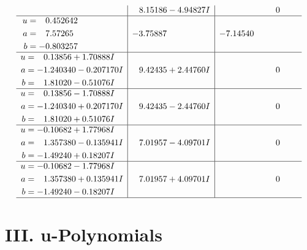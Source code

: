 \documentclass[1p]{elsarticle_modified}
\theoremstyle{definition}
\begin{document}
$$\begin{array}{c|c|c}
 & \phantom{-}8.15186 - 4.94827 I & \phantom{-0.000000 } 0 \\ \hline\begin{aligned}
u &= \phantom{-}0.452642\phantom{ +0.000000I} \\
a &= \phantom{-}7.57265\phantom{ +0.000000I} \\
b &= -0.803257\phantom{ +0.000000I}\end{aligned}
 & -3.75887\phantom{ +0.000000I} & -7.14540\phantom{ +0.000000I} \\ \hline\begin{aligned}
u &= \phantom{-}0.13856 + 1.70888 I \\
a &= -1.240340 - 0.207170 I \\
b &= \phantom{-}1.81020 - 0.51076 I\end{aligned}
 & \phantom{-}9.42435 + 2.44760 I & \phantom{-0.000000 } 0 \\ \hline\begin{aligned}
u &= \phantom{-}0.13856 - 1.70888 I \\
a &= -1.240340 + 0.207170 I \\
b &= \phantom{-}1.81020 + 0.51076 I\end{aligned}
 & \phantom{-}9.42435 - 2.44760 I & \phantom{-0.000000 } 0 \\ \hline\begin{aligned}
u &= -0.10682 + 1.77968 I \\
a &= \phantom{-}1.357380 - 0.135941 I \\
b &= -1.49240 + 0.18207 I\end{aligned}
 & \phantom{-}7.01957 - 4.09701 I & \phantom{-0.000000 } 0 \\ \hline\begin{aligned}
u &= -0.10682 - 1.77968 I \\
a &= \phantom{-}1.357380 + 0.135941 I \\
b &= -1.49240 - 0.18207 I\end{aligned}
 & \phantom{-}7.01957 + 4.09701 I & \phantom{-0.000000 } 0\\
 \hline 
 \end{array}$$\newpage
\newpage\renewcommand{\arraystretch}{1}
\centering \section*{ III. u-Polynomials}
\end{document}
